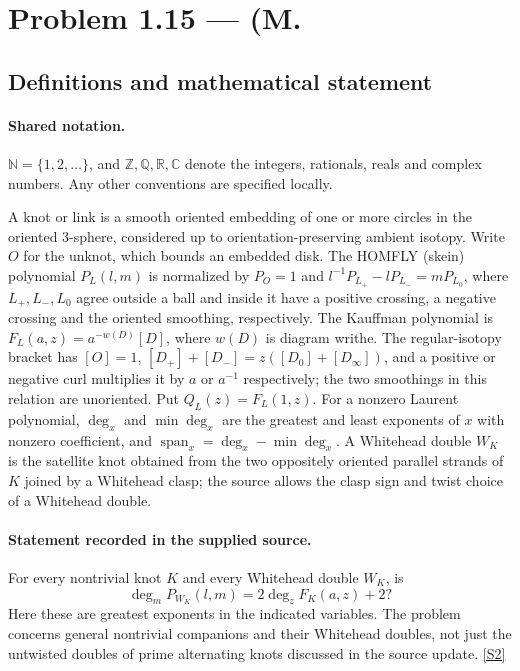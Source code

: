 \documentclass[11pt]{article}
\newcommand{\sref}[2]{\hyperlink{source:#1:#2}{[S#2]}}
\begin{document}
\section{Problem 1.15 — (M.}\label{statement}

\subsection{Definitions and mathematical statement}

\paragraph{Shared notation.}$\mathbb N=\{1,2,\ldots\}$, and $\mathbb Z,\mathbb Q,\mathbb R,\mathbb C$ denote the integers, rationals, reals and complex numbers. Any other conventions are specified locally.


A knot or link is a smooth oriented embedding of one or more circles in the oriented $3$-sphere, considered up to orientation-preserving ambient isotopy. Write $O$ for the unknot, which bounds an embedded disk. The HOMFLY (skein) polynomial $P_L(l,m)$ is normalized by $P_O=1$ and $l^{-1}P_{L_+}-lP_{L_-}=mP_{L_0}$, where $L_+,L_-,L_0$ agree outside a ball and inside it have a positive crossing, a negative crossing and the oriented smoothing, respectively. The Kauffman polynomial is $F_L(a,z)=a^{-w(D)}[D]$, where $w(D)$ is diagram writhe. The regular-isotopy bracket has $[O]=1$, $[D_+]+[D_-]=z([D_0]+[D_\infty])$, and a positive or negative curl multiplies it by $a$ or $a^{-1}$ respectively; the two smoothings in this relation are unoriented. Put $Q_L(z)=F_L(1,z)$. For a nonzero Laurent polynomial, $\deg_x$ and $\min\deg_x$ are the greatest and least exponents of $x$ with nonzero coefficient, and $\operatorname{span}_x=\deg_x-\min\deg_x$. A Whitehead double $W_K$ is the satellite knot obtained from the two oppositely oriented parallel strands of $K$ joined by a Whitehead clasp; the source allows the clasp sign and twist choice of a Whitehead double.
\paragraph{Statement recorded in the supplied source.}
For every nontrivial knot $K$ and every Whitehead double $W_K$, is
\[\deg_mP_{W_K}(l,m)=2\deg_zF_K(a,z)+2?\]
Here these are greatest exponents in the indicated variables. The problem concerns general nontrivial companions and their Whitehead doubles, not just the untwisted doubles of prime alternating knots discussed in the source update. \sref{statement}{2}
\end{document}
